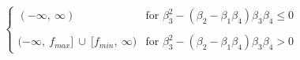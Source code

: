 

\[
\left\{
\begin{array}{ll}
\left.(-\infty, \ \infty) & \mbox{for $\beta_3^2-(\beta_2-\beta_1\beta_4)\beta_3\beta_4 \leq 0$} \\
 & \\
\left.(-\infty, \ f_{max}]\ \cup \ [f_{min}, \ \infty\right.) & \mbox{for $\beta_3^2-(\beta_2-\beta_1\beta_4)\beta_3\beta_4 > 0$} 
\end{array}
\right.
\]


